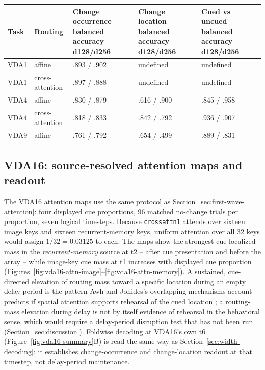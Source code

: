 \documentclass[11pt,a4paper]{article}
\newcommand{\env}[1]{\texttt{#1}}
\begin{document}
\begingroup\small
{}\label{tab:decoder-scores}
\begin{tabularx}{\textwidth}{@{}p{3.0cm}p{2.2cm}Y Y Y@{}}
\toprule
Task & Routing & Change occurrence balanced accuracy d128/d256 & Change location balanced accuracy d128/d256 & Cued vs uncued balanced accuracy d128/d256\\
\midrule
VDA1 & affine & .893 / .902 & undefined & undefined\\
VDA1 & cross-attention & .897 / .888 & undefined & undefined\\
VDA4 & affine & .830 / .879 & .616 / .900 & .845 / .958\\
VDA4 & cross-attention & .818 / .833 & .842 / .792 & .936 / .907\\
VDA9 & affine & .761 / .792 & .654 / .499 & .889 / .831\\
\bottomrule
\end{tabularx}
\endgroup

\subsection{VDA16: source-resolved attention maps and readout}\label{sec:vda16-attention-dynamics}
The VDA16 attention maps use the same protocol as Section~\ref{sec:first-wave-attention}: four displayed cue proportions, 96 matched no-change trials per proportion, seven logical timesteps. Because \env{crossattn1} attends over sixteen image keys and sixteen recurrent-memory keys, uniform attention over all 32 keys would assign $1/32=0.03125$ to each. The maps show the strongest cue-localized mass in the \emph{recurrent-memory} source at t2 -- after cue presentation and before the array -- while image-key cue mass at t1 increases with displayed cue proportion (Figures~\ref{fig:vda16-attn-image}--\ref{fig:vda16-attn-memory}). A sustained, cue-directed elevation of routing mass toward a specific location during an empty delay period is the pattern Awh and Jonides's overlapping-mechanisms account predicts if spatial attention supports rehearsal of the cued location \citep{awh2001}; a routing-mass elevation during delay is not by itself evidence of rehearsal in the behavioral sense, which would require a delay-period disruption test that has not been run (Section~\ref{sec:discussion}). Foldwise decoding at VDA16's own t6 (Figure~\ref{fig:vda16-summary}B) is read the same way as Section~\ref{sec:width-decoding}: it establishes change-occurrence and change-location readout at that timestep, not delay-period maintenance.
\end{document}
